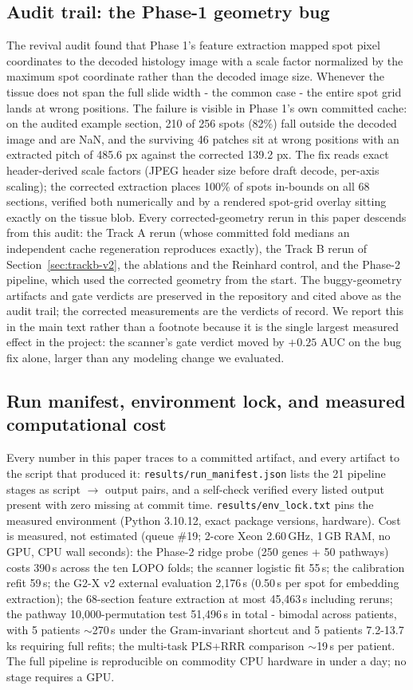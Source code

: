 \documentclass[11pt]{article}
\begin{document}
\subsection{Audit trail: the Phase-1 geometry bug}
The revival audit found that Phase 1's feature extraction mapped spot pixel
coordinates to the decoded histology image with a scale factor normalized by
the maximum spot coordinate rather than the decoded image size. Whenever the
tissue does not span the full slide width - the common case - the entire
spot grid lands at wrong positions. The failure is visible in Phase 1's own
committed cache: on the audited example section, 210 of 256 spots (82\%)
fall outside the decoded image and are NaN, and the surviving 46 patches sit
at wrong positions with an extracted pitch of 485.6 px against the corrected
139.2 px. The fix reads exact header-derived scale factors (JPEG header size
before draft decode, per-axis scaling); the corrected extraction places
100\% of spots in-bounds on all 68 sections, verified both numerically and
by a rendered spot-grid overlay sitting exactly on the tissue blob. Every
corrected-geometry rerun in this paper descends from this audit: the Track A
rerun (whose committed fold medians an independent cache regeneration
reproduces exactly), the Track B rerun of
Section~\ref{sec:trackb-v2}, the ablations and the Reinhard control, and
the Phase-2 pipeline, which used the corrected geometry from the start. The
buggy-geometry artifacts and gate verdicts are preserved in the repository
and cited above as the audit trail; the corrected measurements are the
verdicts of record. We report this in the main text rather than a footnote
because it is the single largest measured effect in the project: the
scanner's gate verdict moved by $+0.25$ AUC on the bug fix alone, larger
than any modeling change we evaluated.

\subsection{Run manifest, environment lock, and measured computational cost}
Every number in this paper traces to a committed artifact, and every artifact
to the script that produced it: \texttt{results/run\_manifest.json} lists
the 21 pipeline stages as script $\to$ output pairs, and a self-check
verified every listed output present with zero missing at commit time.
\texttt{results/env\_lock.txt} pins the measured environment (Python
3.10.12, exact package versions, hardware). Cost is measured, not estimated
(queue \#19; 2-core Xeon 2.60\,GHz, 1\,GB RAM, no GPU, CPU wall seconds):
the Phase-2 ridge probe (250 genes + 50 pathways) costs 390\,s across the
ten LOPO folds; the scanner logistic fit 55\,s; the calibration refit
59\,s; the G2-X v2 external evaluation 2{,}176\,s (0.50\,s per spot for
embedding extraction); the 68-section feature extraction at most
45{,}463\,s including reruns; the pathway 10{,}000-permutation test
51{,}496\,s in total - bimodal across patients, with 5 patients
$\sim$270\,s under the Gram-invariant shortcut and 5 patients
7.2-13.7\,ks requiring full refits; the multi-task PLS+RRR comparison
$\sim$19\,s per patient. The full pipeline is reproducible on commodity
CPU hardware in under a day; no stage requires a GPU.
\end{document}
